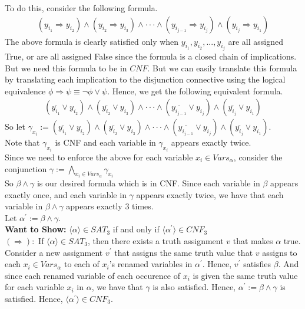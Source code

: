 \documentclass[12pt]{article}
\begin{document}
To do this, consider the following formula. 
\begin{align*}
(y_{i_{1}} \Rightarrow y_{i_{2}}) \land (y_{i_{2}} \Rightarrow y_{i_{3}}) \land \cdot \cdot \cdot \land (y_{i_{j-1}} \Rightarrow y_{i_{j}}) \land (y_{i_{j}} \Rightarrow y_{i_{1}})
\end{align*}
The above formula is clearly satisfied only when $y_{i_{1}},y_{i_2},...,y_{i_j}$ are all assigned True, or are all assigned False since the formula is a closed chain of implications. But we need this formula to be in $CNF$. But we can easily translate this formula by translating each implication to the disjunction connective using the logical equivalence $\phi \Rightarrow \psi \equiv \neg \phi \lor \psi$. Hence, we get the following equivalent formula. 
\begin{align*}
(\overline{y_{i_{1}}} \lor y_{i_{2}}) \land (\overline{y_{i_{2}}} \lor y_{i_{3}}) \land \cdot \cdot \cdot \land (\overline{y_{i_{j-1}}} \lor y_{i_{j}}) \land (\overline{y_{i_{j}}} \lor y_{i_{1}})
\end{align*}
So let $\gamma_{x_i} := (\overline{y_{i_{1}}} \lor y_{i_{2}}) \land (\overline{y_{i_{2}}} \lor y_{i_{3}}) \land \cdot \cdot \cdot \land (\overline{y_{i_{j-1}}} \lor y_{i_{j}}) \land (\overline{y_{i_{j}}} \lor y_{i_{1}})$. \\

Note that $\gamma_{x_i}$ is CNF and each variable in $\gamma_{x_i}$ appears exactly twice. \\

Since we need to enforce the above for each variable $x_i \in Vars_{\alpha}$, consider the conjunction $\gamma := \bigwedge\limits_{x_i \in Vars_{\alpha}}\gamma_{x_i}$ \\

So $\beta \land \gamma$ is our desired formula which is in CNF. Since each variable in $\beta$ appears exactly once, and each variable in $\gamma$ appears exactly twice, we have that each variable in $\beta \land \gamma$ appears exactly 3 times. \\

Let $\alpha^\prime := \beta \land \gamma$. \\

\textbf{Want to Show:} $\langle \alpha \rangle \in SAT_3$ if and only if $\langle \alpha^\prime \rangle \in CNF_3$ \\

$(\Rightarrow):$ If $\langle \alpha \rangle \in SAT_3$, then there exists a truth assignment $v$ that makes $\alpha$ true. Consider a new assignment $v^\prime$ that assigns the same truth value that $v$ assigns to each $x_i \in Vars_{\alpha}$ to each of $x_i$'s renamed variables in $\alpha^\prime$. Hence, $v^\prime$ satisfies $\beta$. And since each renamed variable of each occurence of $x_i$ is given the same truth value for each variable $x_i$ in $\alpha$, we have that $\gamma$ is also satisfied. Hence, $\alpha^\prime := \beta \land \gamma$ is satisfied. Hence, $\langle \alpha^\prime \rangle \in CNF_3$. \\
\end{document}
